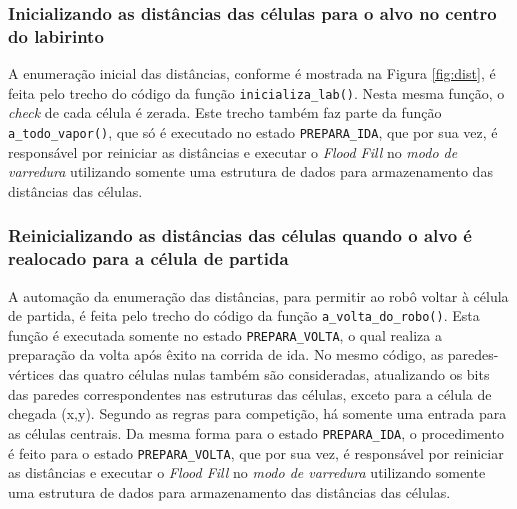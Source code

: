 \subsubsection{Inicializando as distâncias das células para o alvo no centro do labirinto }
A enumeração inicial das distâncias, conforme é mostrada na Figura \ref{fig:dist}, é feita pelo trecho do código da função \verb+inicializa_lab()+. Nesta mesma função, o \emph{check} de cada célula é zerada. Este trecho também faz parte da função \verb+a_todo_vapor()+, que só é executado no estado \verb+PREPARA_IDA+, que por sua vez, é responsável por reiniciar as distâncias e executar o \emph{Flood Fill} no \emph{modo de varredura} utilizando somente uma estrutura de dados para armazenamento das distâncias das células.
	
%
%        

\subsubsection{Reinicializando as distâncias das células quando o alvo é realocado para a célula de partida }
A automação da enumeração das distâncias, para permitir ao robô voltar à célula de partida, é feita pelo trecho do código da função \verb+a_volta_do_robo()+. Esta função é executada somente no estado \verb+PREPARA_VOLTA+, o qual realiza a preparação da volta após êxito na corrida de ida. No mesmo código, as paredes-vértices das quatro células nulas também são consideradas, atualizando os bits das paredes correspondentes nas estruturas das células, exceto para a célula de chegada (x,y). Segundo as regras para competição, há somente uma entrada para as células centrais. Da mesma forma para o estado \verb+PREPARA_IDA+, o procedimento é feito para o estado \verb+PREPARA_VOLTA+, que por sua vez, é responsável por reiniciar as distâncias e executar o \emph{Flood Fill} no \emph{modo de varredura} utilizando somente uma estrutura de dados para armazenamento das distâncias das células.

